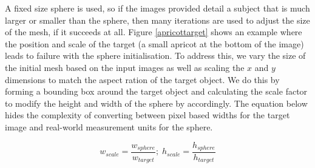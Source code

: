 \documentclass{article}
\begin{document}
A fixed size sphere is used, so if the images provided detail a subject that is much larger or smaller than the sphere, then many iterations are used to adjust the size of the mesh, if it succeeds at all. Figure \ref{apricottarget} shows an example where the position and scale of the target (a small apricot at the bottom of the image) leads to failure with the sphere initialisation. To address this, we vary the size of the initial mesh based on the input images as well as scaling the $x$ and $y$ dimensions to match the aspect ration of the target object. We do this by forming a bounding box around the target object and calculating the scale factor to modify the height and width of the sphere by accordingly. The equation below hides the complexity of converting between pixel based widths for the target image and real-world measurement units for the sphere.

\[w_{scale} = \frac{w_{sphere}}{w_{target}} ;\; h_{scale} = \frac{h_{sphere}}{h_{target}}\]
\end{document}
